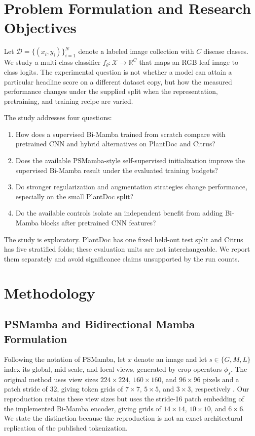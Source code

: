 \documentclass[conference]{IEEEtran}
\begin{document}
\section{Problem Formulation and Research Objectives}
Let $\mathcal{D}=\{(x_i,y_i)\}_{i=1}^{N}$ denote a labeled image collection with $C$ disease classes. We study a multi-class classifier $f_{\theta}:\mathcal{X}\rightarrow\mathbb{R}^{C}$ that maps an RGB leaf image to class logits. The experimental question is not whether a model can attain a particular headline score on a different dataset copy, but how the measured performance changes under the supplied split when the representation, pretraining, and training recipe are varied.

The study addresses four questions:
\begin{enumerate}
    \item How does a supervised Bi-Mamba trained from scratch compare with pretrained CNN and hybrid alternatives on PlantDoc and Citrus?
    \item Does the available PSMamba-style self-supervised initialization improve the supervised Bi-Mamba result under the evaluated training budgets?
    \item Do stronger regularization and augmentation strategies change performance, especially on the small PlantDoc split?
    \item Do the available controls isolate an independent benefit from adding Bi-Mamba blocks after pretrained CNN features?
\end{enumerate}

The study is exploratory. PlantDoc has one fixed held-out test split and Citrus has five stratified folds; these evaluation units are not interchangeable. We report them separately and avoid significance claims unsupported by the run counts.

\section{Methodology}
\subsection{PSMamba and Bidirectional Mamba Formulation}
Following the notation of PSMamba, let $x$ denote an image and let $s\in\{G,M,L\}$ index its global, mid-scale, and local views, generated by crop operators $\phi_s$. The original method uses view sizes $224\times224$, $160\times160$, and $96\times96$ pixels and a patch stride of 32, giving token grids of $7\times7$, $5\times5$, and $3\times3$, respectively \cite{almamun2026psmamba}. Our reproduction retains these view sizes but uses the stride-16 patch embedding of the implemented Bi-Mamba encoder, giving grids of $14\times14$, $10\times10$, and $6\times6$. We state the distinction because the reproduction is not an exact architectural replication of the published tokenization.
\end{document}

